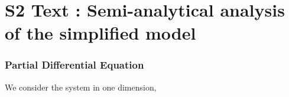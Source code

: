 



\section*{S2 Text : Semi-analytical analysis of the simplified model}


\subsubsection*{Partial Differential Equation}

We consider the system in one dimension, 





